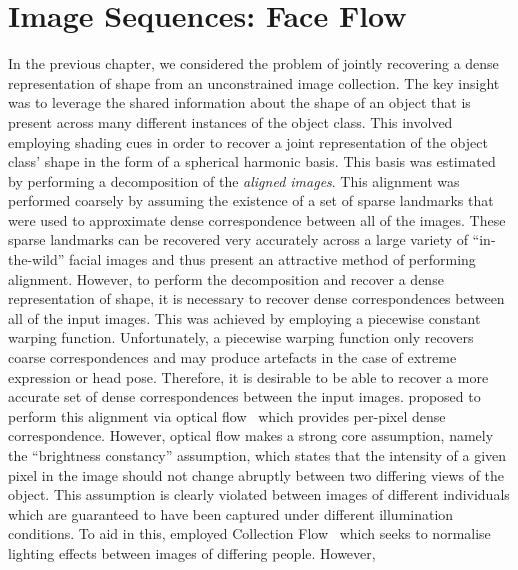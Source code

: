 \chapter{Image Sequences: Face Flow}\label{ch:face_flow}
\minitoc{}
In the previous chapter, we considered the problem of jointly recovering a
dense representation of shape from an unconstrained image collection. The key
insight was to leverage the shared information about the shape of an object
that is present across many different instances of the object class. This
involved employing shading cues in order to recover a joint representation
of the object class' shape in the form of a spherical harmonic basis. This
basis was estimated by performing a decomposition of the
\textit{aligned images}. This alignment was performed coarsely by assuming the
existence of a set of sparse landmarks that were used to approximate
dense correspondence between all of the images. These sparse landmarks can
be recovered very accurately across a large variety of ``in-the-wild'' facial
images and thus present an attractive method of performing alignment. However,
to perform the decomposition and recover a dense representation of shape, it
is necessary to recover dense correspondences between all of the input images. 
This was achieved by employing a piecewise constant warping function. Unfortunately, a
piecewise warping function only recovers coarse correspondences and may produce
artefacts in the case of extreme expression or head pose. Therefore, it is
desirable to be able to recover a more accurate set of dense correspondences 
between the input images. \citet{KemelmacherShlizerman:2013iv} proposed to
perform this alignment via optical flow~\cite{liu2009beyond} which provides
per-pixel dense correspondence. However, optical flow makes a
strong core assumption, namely the ``brightness constancy'' assumption, which states
that the intensity of a given pixel in the image should not change abruptly
between two differing views of the object. This assumption is clearly
violated between images of different individuals which are guaranteed to
have been captured under different illumination conditions. To aid in this,
\citet{KemelmacherShlizerman:2013iv} employed
Collection Flow~\cite{kemelmacher2012collection} which seeks to normalise
lighting effects between images of differing people. However, 
